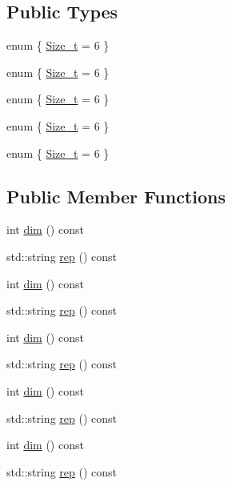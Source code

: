 \subsection*{Public Types}
\begin{DoxyCompactItemize}
\item 
enum \{ \mbox{\hyperlink{structHadron_1_1J5o2Rep_af46c1f9c18c31e97e4d0dfec6b071e9ca901b5b392ebf13c294bd161aef19a01b}{Size\+\_\+t}} = 6
 \}
\item 
enum \{ \mbox{\hyperlink{structHadron_1_1J5o2Rep_af46c1f9c18c31e97e4d0dfec6b071e9ca901b5b392ebf13c294bd161aef19a01b}{Size\+\_\+t}} = 6
 \}
\item 
enum \{ \mbox{\hyperlink{structHadron_1_1J5o2Rep_af46c1f9c18c31e97e4d0dfec6b071e9ca901b5b392ebf13c294bd161aef19a01b}{Size\+\_\+t}} = 6
 \}
\item 
enum \{ \mbox{\hyperlink{structHadron_1_1J5o2Rep_af46c1f9c18c31e97e4d0dfec6b071e9ca901b5b392ebf13c294bd161aef19a01b}{Size\+\_\+t}} = 6
 \}
\item 
enum \{ \mbox{\hyperlink{structHadron_1_1J5o2Rep_af46c1f9c18c31e97e4d0dfec6b071e9ca901b5b392ebf13c294bd161aef19a01b}{Size\+\_\+t}} = 6
 \}
\end{DoxyCompactItemize}
\subsection*{Public Member Functions}
\begin{DoxyCompactItemize}
\item 
int \mbox{\hyperlink{structHadron_1_1J5o2Rep_a0a185f6fcbb5ce65c0af1615cf1f4e76}{dim}} () const
\item 
std\+::string \mbox{\hyperlink{structHadron_1_1J5o2Rep_a43d3fc5ff7f61a64d8dac3b700b2c140}{rep}} () const
\item 
int \mbox{\hyperlink{structHadron_1_1J5o2Rep_a0a185f6fcbb5ce65c0af1615cf1f4e76}{dim}} () const
\item 
std\+::string \mbox{\hyperlink{structHadron_1_1J5o2Rep_a43d3fc5ff7f61a64d8dac3b700b2c140}{rep}} () const
\item 
int \mbox{\hyperlink{structHadron_1_1J5o2Rep_a0a185f6fcbb5ce65c0af1615cf1f4e76}{dim}} () const
\item 
std\+::string \mbox{\hyperlink{structHadron_1_1J5o2Rep_a43d3fc5ff7f61a64d8dac3b700b2c140}{rep}} () const
\item 
int \mbox{\hyperlink{structHadron_1_1J5o2Rep_a0a185f6fcbb5ce65c0af1615cf1f4e76}{dim}} () const
\item 
std\+::string \mbox{\hyperlink{structHadron_1_1J5o2Rep_a43d3fc5ff7f61a64d8dac3b700b2c140}{rep}} () const
\item 
int \mbox{\hyperlink{structHadron_1_1J5o2Rep_a0a185f6fcbb5ce65c0af1615cf1f4e76}{dim}} () const
\item 
std\+::string \mbox{\hyperlink{structHadron_1_1J5o2Rep_a43d3fc5ff7f61a64d8dac3b700b2c140}{rep}} () const
\end{DoxyCompactItemize}


